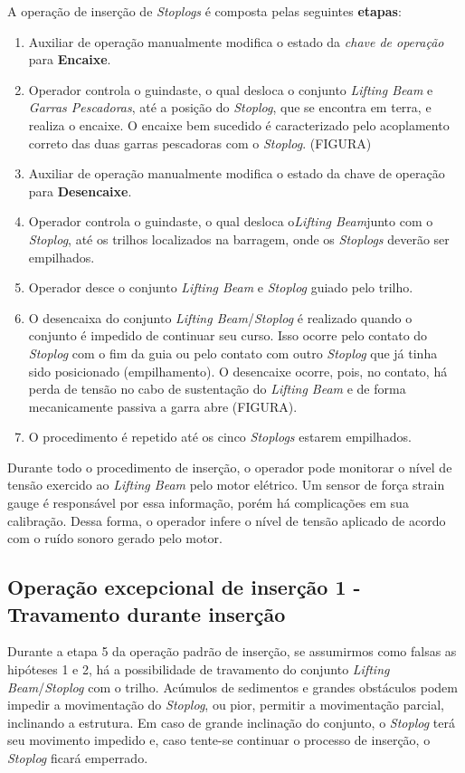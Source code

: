 A operação de inserção de \emph{Stoplogs} é composta pelas seguintes
\textbf{etapas}:
\begin{enumerate}
\item Auxiliar de operação manualmente modifica o estado da \emph{chave de operação} para \textbf{Encaixe}.
\item Operador controla o guindaste, o qual desloca o conjunto \emph{Lifting Beam} e \emph{Garras Pescadoras}, até a posição do \emph{Stoplog}, que se encontra em terra, e realiza o encaixe. O encaixe bem sucedido é caracterizado pelo acoplamento correto das duas garras pescadoras com o \emph{Stoplog}. (FIGURA)
\item Auxiliar de operação manualmente modifica o estado da chave de operação para \textbf{Desencaixe}.
\item Operador controla o guindaste, o qual desloca o\emph{Lifting Beam}junto com o \emph{Stoplog}, até os trilhos localizados na barragem, onde os \emph{Stoplogs} deverão ser empilhados.
\item Operador desce o conjunto \emph{Lifting Beam} e \emph{Stoplog} guiado pelo trilho.
\item O desencaixa do conjunto \emph{Lifting Beam}/\emph{Stoplog} é realizado quando o conjunto é impedido de continuar seu curso. Isso ocorre pelo contato do \emph{Stoplog} com o fim da guia ou pelo contato com outro \emph{Stoplog} que já tinha sido posicionado (empilhamento). O desencaixe ocorre, pois, no contato, há perda de tensão no cabo de sustentação do \emph{Lifting Beam} e de forma mecanicamente passiva a garra abre (FIGURA).
\item O procedimento é repetido até os cinco \emph{Stoplogs} estarem empilhados.
\end{enumerate}

Durante todo o procedimento de inserção, o operador pode monitorar o nível de
tensão exercido ao \emph{Lifting Beam} pelo motor elétrico. Um sensor de força
strain gauge é responsável por essa informação, porém há complicações em sua
calibração. Dessa forma, o operador infere o nível de tensão aplicado de acordo
com o ruído sonoro gerado pelo motor.

\subsection{Operação excepcional de inserção 1 - Travamento durante inserção}
Durante a etapa 5 da operação padrão de inserção, se assumirmos como falsas as
hipóteses 1 e 2, há a possibilidade de travamento do conjunto \emph{Lifting
Beam}/\emph{Stoplog} com o trilho. Acúmulos de sedimentos e grandes obstáculos
podem impedir a movimentação do \emph{Stoplog}, ou pior, permitir a movimentação
parcial, inclinando a estrutura. Em caso de grande inclinação do conjunto, o
\emph{Stoplog} terá seu movimento impedido e, caso tente-se continuar o processo
de inserção, o \emph{Stoplog} ficará emperrado.

